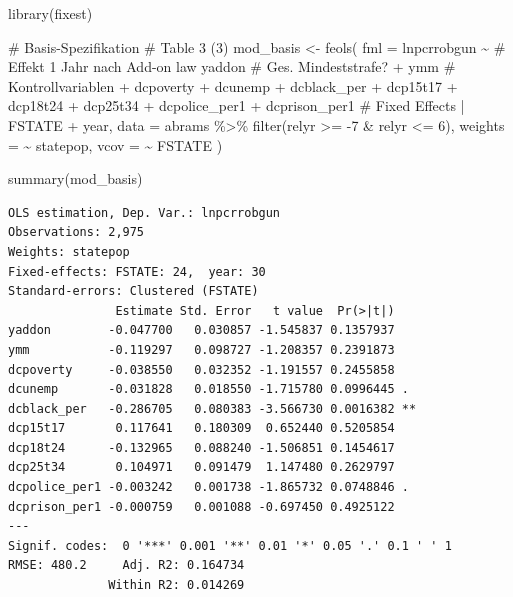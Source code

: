 \documentclass[
  a4paper,
  DIV=11,
  oneside]{scrreprt}
\newenvironment{Shaded}{\begin{snugshade}}{\end{snugshade}}
\newcommand{\AttributeTok}[1]{\textcolor[rgb]{0.40,0.45,0.13}{#1}}
\newcommand{\CommentTok}[1]{\textcolor[rgb]{0.37,0.37,0.37}{#1}}
\newcommand{\DecValTok}[1]{\textcolor[rgb]{0.68,0.00,0.00}{#1}}
\newcommand{\FunctionTok}[1]{\textcolor[rgb]{0.28,0.35,0.67}{#1}}
\newcommand{\NormalTok}[1]{\textcolor[rgb]{0.00,0.23,0.31}{#1}}
\newcommand{\OtherTok}[1]{\textcolor[rgb]{0.00,0.23,0.31}{#1}}
\newcommand{\SpecialCharTok}[1]{\textcolor[rgb]{0.37,0.37,0.37}{#1}}
\begin{document}
\begin{Shaded}
\begin{Highlighting}[]
\FunctionTok{library}\NormalTok{(fixest)}

\CommentTok{\# Basis{-}Spezifikation}
\CommentTok{\# Table 3 (3)}
\NormalTok{mod\_basis }\OtherTok{\textless{}{-}} \FunctionTok{feols}\NormalTok{(}
  \AttributeTok{fml =}\NormalTok{ lnpcrrobgun }\SpecialCharTok{\textasciitilde{}}
   \CommentTok{\# Effekt 1 Jahr nach Add{-}on law              }
\NormalTok{   yaddon}
   \CommentTok{\# Ges. Mindeststrafe?}
   \SpecialCharTok{+}\NormalTok{ ymm}
   \CommentTok{\# Kontrollvariablen}
   \SpecialCharTok{+}\NormalTok{ dcpoverty}
   \SpecialCharTok{+}\NormalTok{ dcunemp}
   \SpecialCharTok{+}\NormalTok{ dcblack\_per}
   \SpecialCharTok{+}\NormalTok{ dcp15t17}
   \SpecialCharTok{+}\NormalTok{ dcp18t24 }
   \SpecialCharTok{+}\NormalTok{ dcp25t34}
   \SpecialCharTok{+}\NormalTok{ dcpolice\_per1}
   \SpecialCharTok{+}\NormalTok{ dcprison\_per1}
   \CommentTok{\# Fixed Effects}
   \SpecialCharTok{|}\NormalTok{ FSTATE }\SpecialCharTok{+}\NormalTok{ year,}
   \AttributeTok{data =}\NormalTok{ abrams }\SpecialCharTok{\%\textgreater{}\%} 
     \FunctionTok{filter}\NormalTok{(relyr }\SpecialCharTok{\textgreater{}=} \SpecialCharTok{{-}}\DecValTok{7} \SpecialCharTok{\&}\NormalTok{ relyr }\SpecialCharTok{\textless{}=} \DecValTok{6}\NormalTok{), }
   \AttributeTok{weights =} \SpecialCharTok{\textasciitilde{}}\NormalTok{ statepop,}
   \AttributeTok{vcov =} \SpecialCharTok{\textasciitilde{}}\NormalTok{ FSTATE}
\NormalTok{)}

\FunctionTok{summary}\NormalTok{(mod\_basis)}
\end{Highlighting}
\end{Shaded}

\begin{verbatim}
OLS estimation, Dep. Var.: lnpcrrobgun
Observations: 2,975
Weights: statepop
Fixed-effects: FSTATE: 24,  year: 30
Standard-errors: Clustered (FSTATE) 
               Estimate Std. Error   t value  Pr(>|t|)    
yaddon        -0.047700   0.030857 -1.545837 0.1357937    
ymm           -0.119297   0.098727 -1.208357 0.2391873    
dcpoverty     -0.038550   0.032352 -1.191557 0.2455858    
dcunemp       -0.031828   0.018550 -1.715780 0.0996445 .  
dcblack_per   -0.286705   0.080383 -3.566730 0.0016382 ** 
dcp15t17       0.117641   0.180309  0.652440 0.5205854    
dcp18t24      -0.132965   0.088240 -1.506851 0.1454617    
dcp25t34       0.104971   0.091479  1.147480 0.2629797    
dcpolice_per1 -0.003242   0.001738 -1.865732 0.0748846 .  
dcprison_per1 -0.000759   0.001088 -0.697450 0.4925122    
---
Signif. codes:  0 '***' 0.001 '**' 0.01 '*' 0.05 '.' 0.1 ' ' 1
RMSE: 480.2     Adj. R2: 0.164734
              Within R2: 0.014269
\end{verbatim}
\end{document}
